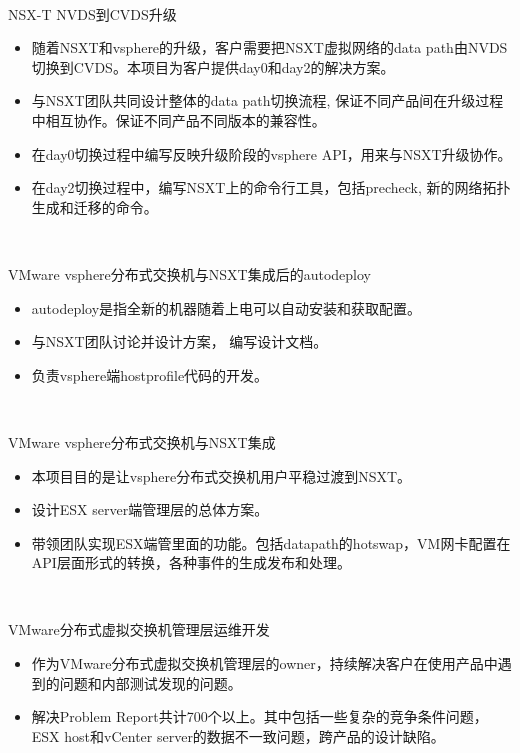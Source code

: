 \documentclass{resume}
\begin{document}
~\\
\begin{onehalfspacing}
NSX-T NVDS到CVDS升级
\begin{itemize}
  \item 随着NSXT和vsphere的升级，客户需要把NSXT虚拟网络的data path由NVDS切换到CVDS。本项目为客户提供day0和day2的解决方案。
  \item 与NSXT团队共同设计整体的data path切换流程, 保证不同产品间在升级过程中相互协作。保证不同产品不同版本的兼容性。
  \item 在day0切换过程中编写反映升级阶段的vsphere API，用来与NSXT升级协作。
  \item 在day2切换过程中，编写NSXT上的命令行工具，包括precheck, 新的网络拓扑生成和迁移的命令。
\end{itemize}
\end{onehalfspacing}

~\\
\begin{onehalfspacing}
VMware vsphere分布式交换机与NSXT集成后的autodeploy
\begin{itemize}
  \item autodeploy是指全新的机器随着上电可以自动安装和获取配置。
  \item 与NSXT团队讨论并设计方案， 编写设计文档。
  \item 负责vsphere端hostprofile代码的开发。
\end{itemize}
\end{onehalfspacing}

~\\
\begin{onehalfspacing}
VMware vsphere分布式交换机与NSXT集成
\begin{itemize}
  \item 本项目目的是让vsphere分布式交换机用户平稳过渡到NSXT。
  \item 设计ESX server端管理层的总体方案。
  \item 带领团队实现ESX端管里面的功能。包括datapath的hotswap，VM网卡配置在API层面形式的转换，各种事件的生成发布和处理。
\end{itemize}
\end{onehalfspacing}

~\\
\begin{onehalfspacing}
VMware分布式虚拟交换机管理层运维开发
\begin{itemize}
  \item 作为VMware分布式虚拟交换机管理层的owner，持续解决客户在使用产品中遇到的问题和内部测试发现的问题。
  \item 解决Problem Report共计700个以上。其中包括一些复杂的竞争条件问题，ESX host和vCenter server的数据不一致问题，跨产品的设计缺陷。
\end{itemize}
\end{onehalfspacing}
\end{document}
